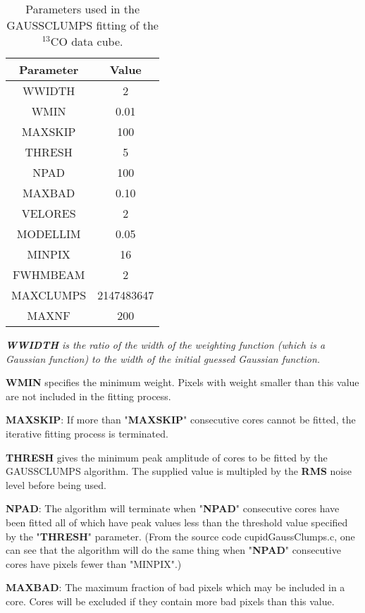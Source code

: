 \documentclass[12pt,preprint]{aastex}
\begin{document}
\begin{table}[htb]
\begin{center}
\caption{Parameters used in the GAUSSCLUMPS fitting of the $^{13}$CO data cube.\label{gaussclumpspara}}
\begin{tabular}{|c|c|}
\hline \hline  Parameter & Value \\
\hline
WWIDTH      & 2  \\\hline
WMIN        & 0.01 \\\hline
MAXSKIP     & 100  \\\hline
THRESH      & 5 \\\hline
NPAD        & 100  \\\hline
MAXBAD      & 0.10  \\\hline
VELORES     & 2  \\\hline
MODELLIM    & 0.05  \\\hline
MINPIX      & 16  \\\hline
FWHMBEAM    & 2  \\\hline
MAXCLUMPS   & 2147483647  \\\hline
MAXNF       & 200  \\\hline
\hline
\end{tabular}
\end{center}
\footnotesize \it
{\rm\bf WWIDTH} is the ratio of the width of the weighting function (which is a Gaussian function) to
the width of the initial guessed Gaussian function.

{\rm\bf WMIN} specifies the minimum weight. Pixels with weight smaller than this value are not included
in the fitting process.

{\rm\bf MAXSKIP}: If more than "{\rm\bf MAXSKIP}"  consecutive cores cannot be fitted, the iterative fitting
process is terminated.

{\rm\bf THRESH} gives the minimum peak amplitude of cores to be fitted by the GAUSSCLUMPS algorithm. The supplied value
is multipled by the {\rm\bf RMS} noise level before being used.

{\rm\bf NPAD}: The algorithm will terminate when "{\rm\bf NPAD}"  consecutive cores have been fitted all of
which have peak values less than the threshold value specified by the "{\rm\bf THRESH}" parameter. (From the source code cupidGaussClumps.c,
one can see that the algorithm will do the same thing when "{\rm\bf NPAD}" consecutive cores have pixels fewer than
"MINPIX".)

{\rm\bf MAXBAD}: The maximum fraction of bad pixels which may be included in a core. Cores will
be excluded if they contain more bad pixels than this value.


\end{table}
\end{document}
